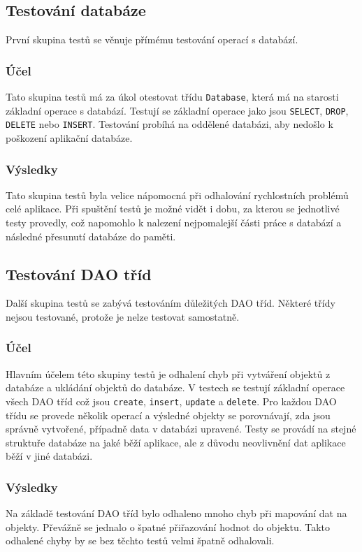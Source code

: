 \documentclass[thesis=B,czech]{resources/FITthesis}[2012/06/26]
\begin{document}
		\subsection{Testování databáze}
První skupina testů se věnuje přímému testování operací s databází. 
			\subsubsection*{Účel}
Tato skupina testů má za úkol otestovat třídu \texttt{Database}, která má na starosti základní operace s databází. Testují se základní operace jako jsou \texttt{SELECT}, \texttt{DROP}, \texttt{DELETE} nebo \texttt{INSERT}. Testování probíhá na oddělené databázi, aby nedošlo k poškození aplikační databáze. 			

			\subsubsection*{Výsledky}
Tato skupina testů byla velice nápomocná při odhalování rychlostních problémů celé aplikace. Při spuštění testů je možné vidět i dobu, za kterou se jednotlivé testy provedly, což napomohlo k nalezení nejpomalejší části práce s databází a následné přesunutí databáze do paměti.

		\subsection{Testování DAO tříd}
Další skupina testů se zabývá testováním důležitých DAO tříd. Některé třídy nejsou testované, protože je nelze testovat samostatně.
			\subsubsection*{Účel}
Hlavním účelem této skupiny testů je odhalení chyb při vytváření objektů z databáze a ukládání objektů do databáze. V testech se testují základní operace všech DAO tříd což jsou \texttt{create}, \texttt{insert}, \texttt{update} a \texttt{delete}. Pro každou DAO třídu se provede několik operací a výsledné objekty se porovnávají, zda jsou správně vytvořené, případně data v databázi upravené. Testy se provádí na stejné struktuře databáze na jaké běží aplikace, ale z důvodu neovlivnění dat aplikace běží v jiné databázi.
			
			\subsubsection*{Výsledky}
Na základě testování DAO tříd bylo odhaleno mnoho chyb při mapování dat na objekty. Převážně se jednalo o špatné přiřazování hodnot do objektu. Takto odhalené chyby by se bez těchto testů velmi špatně odhalovali.			
\end{document}
